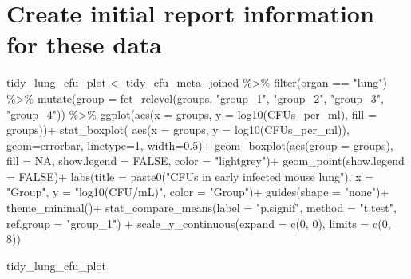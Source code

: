 \documentclass[
]{book}
\newenvironment{Shaded}{\begin{snugshade}}{\end{snugshade}}
\newcommand{\AttributeTok}[1]{\textcolor[rgb]{0.77,0.63,0.00}{#1}}
\newcommand{\ConstantTok}[1]{\textcolor[rgb]{0.00,0.00,0.00}{#1}}
\newcommand{\DecValTok}[1]{\textcolor[rgb]{0.00,0.00,0.81}{#1}}
\newcommand{\FloatTok}[1]{\textcolor[rgb]{0.00,0.00,0.81}{#1}}
\newcommand{\FunctionTok}[1]{\textcolor[rgb]{0.00,0.00,0.00}{#1}}
\newcommand{\NormalTok}[1]{#1}
\newcommand{\OtherTok}[1]{\textcolor[rgb]{0.56,0.35,0.01}{#1}}
\newcommand{\SpecialCharTok}[1]{\textcolor[rgb]{0.00,0.00,0.00}{#1}}
\newcommand{\StringTok}[1]{\textcolor[rgb]{0.31,0.60,0.02}{#1}}
\begin{document}
\hypertarget{create-initial-report-information-for-these-data}{%
\section{Create initial report information for these data}\label{create-initial-report-information-for-these-data}}

\begin{Shaded}
\begin{Highlighting}[]
\NormalTok{tidy\_lung\_cfu\_plot }\OtherTok{\textless{}{-}}\NormalTok{ tidy\_cfu\_meta\_joined }\SpecialCharTok{\%\textgreater{}\%}
  \FunctionTok{filter}\NormalTok{(organ }\SpecialCharTok{==} \StringTok{"lung"}\NormalTok{) }\SpecialCharTok{\%\textgreater{}\%}
  \FunctionTok{mutate}\NormalTok{(}\AttributeTok{group =} \FunctionTok{fct\_relevel}\NormalTok{(groups, }\StringTok{"group\_1"}\NormalTok{, }\StringTok{"group\_2"}\NormalTok{, }\StringTok{"group\_3"}\NormalTok{, }\StringTok{"group\_4"}\NormalTok{)) }\SpecialCharTok{\%\textgreater{}\%}
  \FunctionTok{ggplot}\NormalTok{(}\FunctionTok{aes}\NormalTok{(}\AttributeTok{x =}\NormalTok{ groups, }\AttributeTok{y =} \FunctionTok{log10}\NormalTok{(CFUs\_per\_ml), }\AttributeTok{fill =}\NormalTok{ groups))}\SpecialCharTok{+}
  \FunctionTok{stat\_boxplot}\NormalTok{( }\FunctionTok{aes}\NormalTok{(}\AttributeTok{x =}\NormalTok{ groups, }\AttributeTok{y =} \FunctionTok{log10}\NormalTok{(CFUs\_per\_ml)), }
    \AttributeTok{geom=}\StringTok{\textquotesingle{}errorbar\textquotesingle{}}\NormalTok{, }\AttributeTok{linetype=}\DecValTok{1}\NormalTok{, }\AttributeTok{width=}\FloatTok{0.5}\NormalTok{)}\SpecialCharTok{+} 
  \FunctionTok{geom\_boxplot}\NormalTok{(}\FunctionTok{aes}\NormalTok{(}\AttributeTok{group =}\NormalTok{ groups), }\AttributeTok{fill =} \ConstantTok{NA}\NormalTok{, }\AttributeTok{show.legend =} \ConstantTok{FALSE}\NormalTok{, }\AttributeTok{color =} \StringTok{"lightgrey"}\NormalTok{)}\SpecialCharTok{+}
  \FunctionTok{geom\_point}\NormalTok{(}\AttributeTok{show.legend =} \ConstantTok{FALSE}\NormalTok{)}\SpecialCharTok{+}
  \FunctionTok{labs}\NormalTok{(}\AttributeTok{title =} \FunctionTok{paste0}\NormalTok{(}\StringTok{"CFUs in early infected mouse lung"}\NormalTok{), }\AttributeTok{x =} \StringTok{"Group"}\NormalTok{, }\AttributeTok{y =} \StringTok{"log10(CFU/mL)"}\NormalTok{,}
       \AttributeTok{color =} \StringTok{"Group"}\NormalTok{)}\SpecialCharTok{+}
  \FunctionTok{guides}\NormalTok{(}\AttributeTok{shape =} \StringTok{"none"}\NormalTok{)}\SpecialCharTok{+}
  \FunctionTok{theme\_minimal}\NormalTok{()}\SpecialCharTok{+}
  \FunctionTok{stat\_compare\_means}\NormalTok{(}\AttributeTok{label =} \StringTok{"p.signif"}\NormalTok{, }\AttributeTok{method =} \StringTok{"t.test"}\NormalTok{, }\AttributeTok{ref.group =} \StringTok{"group\_1"}\NormalTok{) }\SpecialCharTok{+} 
  \FunctionTok{scale\_y\_continuous}\NormalTok{(}\AttributeTok{expand =} \FunctionTok{c}\NormalTok{(}\DecValTok{0}\NormalTok{, }\DecValTok{0}\NormalTok{), }\AttributeTok{limits =} \FunctionTok{c}\NormalTok{(}\DecValTok{0}\NormalTok{, }\DecValTok{8}\NormalTok{))}

\NormalTok{tidy\_lung\_cfu\_plot}
\end{Highlighting}
\end{Shaded}
\end{document}
